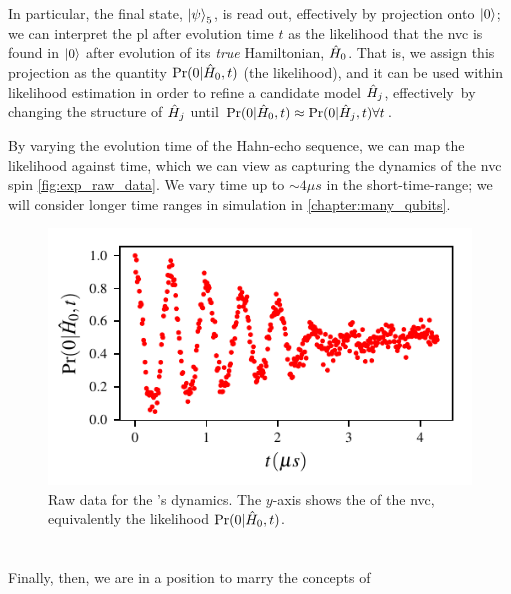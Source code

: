 In particular, the final state, $\ket{\psi}_5$, is read out, effectively by projection onto $\ket{0}$;
    we can interpret the \gls{pl} after evolution time $t$ as the \gls{likelihood} 
    that the \gls{nvc} is found in $\ket{0}$ after evolution of its \emph{true} Hamiltonian, $\hat{H}_0$. 
That is, we assign this projection as the quantity $\Pr(0 | \hat{H}_0, t)$ (the \gls{likelihood}), 
    and it can be used within likelihood estimation in order to refine a candidate model $\hat{H}_j$, 
    effectively\footnotemark \ by changing the structure of 
    $\hat{H}_j$ until $\Pr(0 | \hat{H}_0, t) \approx \Pr(0 | \hat{H}_j, t) \forall t$. 

\par 

By varying the evolution time of the Hahn-echo sequence, we can map the likelihood 
    against time, which we can view as capturing the dynamics of the \gls{nvc} spin \cref{fig:exp_raw_data}.
We vary time up to $\sim 4 \mu s$ in the short-time-range; 
    we will consider longer time ranges in simulation in \cref{chapter:many_qubits}. 

\begin{figure}
    \begin{center}
        \includegraphics{experimental_study/figures/raw_data.pdf}
    \end{center}
    \caption[Raw data for the 's dynamics.]{
        Raw data for the 's dynamics.
        The $y$-axis shows the  of the \gls{nvc}, 
        equivalently the likelihood $\Pr(0 | \hat{H}_0, t)$. 
    }
\end{figure}


\section{}
Finally, then, we are in a position to marry the concepts of 

